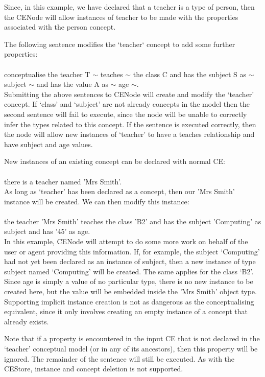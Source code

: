 \documentclass{scrartcl}
\newcommand{\ce}[1]{\textsf{#1}}
\begin{document}
Since, in this example, we have declared that a teacher is a type of person, then the CENode will allow instances of teacher to be made with the properties associated with the person concept.

The following sentence modifies the `teacher` concept to add some further properties:\\
\\\ce{conceptualise the teacher T $\sim$ teaches $\sim$ the class C and has the subject S as $\sim$ subject $\sim$ and has the value A as $\sim$ age $\sim$.}\\

Submitting the above sentences to CENode will create and modify the `teacher' concept. If `class' and `subject' are not already concepts in the model then the second sentence will fail to execute, since the node will be unable to correctly infer the types related to this concept. If the sentence is executed correctly, then the node will allow new instances of `teacher' to have a \ce{teaches} relationship and have \ce{subject} and \ce{age} values.

New instances of an existing concept can be declared with normal CE:\\
\\\ce{there is a teacher named 'Mrs Smith'.}\\

As long as `teacher' has been declared as a concept, then our 'Mrs Smith' instance will be created. We can then modify this instance:\\
\\\ce{the teacher 'Mrs Smith' teaches the class 'B2' and has the subject 'Computing' as subject and has '45' as age.}\\

In this example, CENode will attempt to do some more work on behalf of the user or agent providing this information. If, for example, the subject `Computing' had not yet been declared as an instance of \ce{subject}, then a new instance of type \ce{subject} named `Computing' will be created. The same applies for the \ce{class} `B2'. Since \ce{age} is simply a value of no particular type, there is no new instance to be created here, but the value will be embedded inside the 'Mrs Smith' object type. Supporting implicit instance creation is not as dangerous as the conceptualising equivalent, since it only involves creating an empty instance of a concept that already exists.

Note that if a property is encountered in the input CE that is not declared in the `teacher' conceptual model (or in any of its ancestors), then this property will be ignored. The remainder of the sentence will still be executed. As with the CEStore, instance and concept deletion is not supported.
\end{document}

